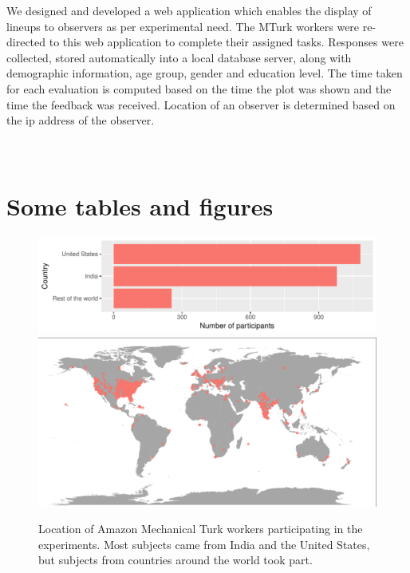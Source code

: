 \documentclass[10pt]{article}\usepackage[]{graphicx}\usepackage[]{xcolor}
\begin{document}
We designed and developed a web application which enables the display of lineups to  observers as per experimental need. The MTurk workers were re-directed to this web application to complete their assigned tasks. Responses were collected, stored automatically into a local database server, along with demographic information, age group, gender and education level. The time taken for each evaluation is computed based on the time the plot was shown and the time the feedback was received. Location of an observer is determined based on the ip address of the observer.



\section{\\Some tables and figures}

\begin{figure}[htbp] 
   \centering
   \includegraphics[width=4.5in]{turker_country.pdf} 
   \includegraphics[width=4.5in]{turker_location.pdf}    
   \caption{Location of Amazon Mechanical Turk workers participating in the experiments. Most subjects came from India and the United States, but subjects from countries around the world took part.}
   \label{fig:turker_location}
\end{figure}
\end{document}
